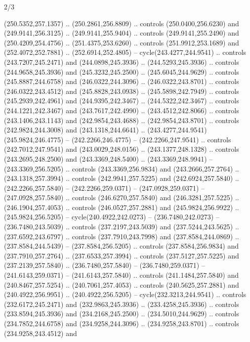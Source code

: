\begin{flagdescription}{2/3}
\begin{scope}[xshift=0.5\flaglength,yshift=0.5\flagwidth,scale=\flagwidth/235.81]
\begin{scope}[y=0.8pt, x=0.8pt, yscale=-1,shift={(-239.08,-147.38)}]
    (250.5352,257.1357) .. (250.2861,256.8809) .. controls (250.0400,256.6230) and
    (249.9141,256.3125) .. (249.9141,255.9404) .. controls (249.9141,255.2490) and
    (250.4209,254.4756) .. (251.4375,253.6260) .. controls (251.9912,253.1689) and
    (252.4072,252.7881) .. (252.6914,252.4805) -- cycle(243.4277,244.9541) ..
    controls (243.7207,245.2471) and (244.0898,245.3936) .. (244.5293,245.3936) ..
    controls (244.9658,245.3936) and (245.3232,245.2500) .. (245.6045,244.9629) ..
    controls (245.8887,244.6758) and (246.0322,244.3096) .. (246.0322,243.8701) ..
    controls (246.0322,243.4512) and (245.8828,243.0938) .. (245.5898,242.7949) ..
    controls (245.2939,242.4961) and (244.9395,242.3467) .. (244.5322,242.3467) ..
    controls (244.1221,242.3467) and (243.7617,242.4990) .. (243.4512,242.8066) ..
    controls (243.1406,243.1143) and (242.9854,243.4688) .. (242.9854,243.8701) ..
    controls (242.9824,244.3008) and (243.1318,244.6641) ..
    (243.4277,244.9541)(245.9824,246.4775) -- (242.2266,246.4775) --
    (242.2266,247.9541) .. controls (242.7012,247.9541) and (243.0029,248.0156) ..
    (243.1377,248.1328) .. controls (243.2695,248.2500) and (243.3369,248.5400) ..
    (243.3369,248.9941) -- (243.3369,256.5205) .. controls (243.3369,256.9834) and
    (243.2666,257.2764) .. (243.1318,257.3994) .. controls (242.9941,257.5225) and
    (242.6924,257.5840) .. (242.2266,257.5840) -- (242.2266,259.0371) --
    (247.0928,259.0371) -- (247.0928,257.5840) .. controls (246.6270,257.5840) and
    (246.3281,257.5225) .. (246.1904,257.4053) .. controls (246.0527,257.2881) and
    (245.9824,256.9922) .. (245.9824,256.5205) -- cycle(240.4922,242.0273) --
    (236.7480,242.0273) -- (236.7480,243.5039) .. controls (237.2197,243.5039) and
    (237.5244,243.5625) .. (237.6592,243.6797) .. controls (237.7910,243.7998) and
    (237.8584,244.0869) .. (237.8584,244.5439) -- (237.8584,256.5205) .. controls
    (237.8584,256.9834) and (237.7910,257.2764) .. (237.6533,257.3994) .. controls
    (237.5127,257.5225) and (237.2139,257.5840) .. (236.7480,257.5840) --
    (236.7480,259.0371) -- (241.6143,259.0371) -- (241.6143,257.5840) .. controls
    (241.1484,257.5840) and (240.8467,257.5254) .. (240.7061,257.4053) .. controls
    (240.5625,257.2881) and (240.4922,256.9951) .. (240.4922,256.5205) --
    cycle(232.3213,244.9541) .. controls (232.6172,245.2471) and
    (232.9863,245.3936) .. (233.4258,245.3936) .. controls (233.8594,245.3936) and
    (234.2168,245.2500) .. (234.5010,244.9629) .. controls (234.7852,244.6758) and
    (234.9258,244.3096) .. (234.9258,243.8701) .. controls (234.9258,243.4512) and

\end{scope}
\end{scope}
\end{flagdescription}
